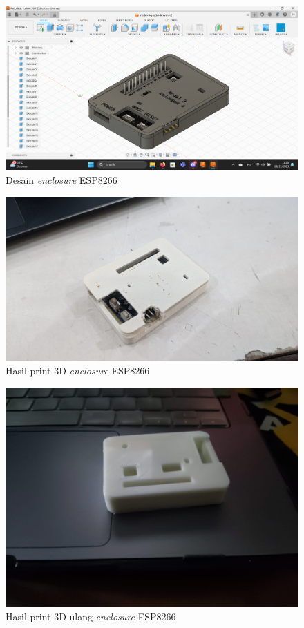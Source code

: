 \begin{figure}[htbp]
  \centering
  \includegraphics[width=0.8\linewidth]{img/enclosure-3d.png}
  \caption{Desain \textit{enclosure} ESP8266} 
  \label{fig:enclosure-3d}
\end{figure}

\begin{figure}[htbp]
  \centering
  \includegraphics[width=0.8\linewidth]{img/enclosured.jpeg}
  \caption{Hasil print 3D \textit{enclosure} ESP8266} 
  \label{fig:enclosure-jadi}
\end{figure}

\begin{figure}[htbp]
  \centering
  \includegraphics[width=0.8\linewidth]{img/enclosure-new.jpeg}
  \caption{Hasil print 3D ulang \textit{enclosure} ESP8266} 
  \label{fig:enclosure-jadi-new}
\end{figure}